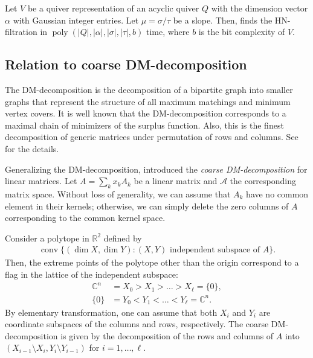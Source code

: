 \documentclass[a4paper,11pt]{article}
\numberwithin{equation}{section}
\newcommand{\C}{\mathbb{C}}
\newcommand{\R}{\mathbb{R}}
\newcommand{\caA}{\mathcal{A}}
\DeclareMathOperator{\poly}{poly}
\DeclareMathOperator{\conv}{conv}
\begin{document}
\begin{theorem}\label{thm:HN}
    Let $V$ be a quiver representation of an acyclic quiver $Q$ with the dimension vector $\alpha$ with Gaussian integer entries.
    Let $\mu = \sigma/\tau$ be a slope.
    Then,  finds the HN-filtration in $\poly(|Q|, |\alpha|, |\sigma|, |\tau|, b)$ time, where $b$ is the bit complexity of $V$.
\end{theorem}

\subsection{Relation to coarse DM-decomposition}\label{subsec:coarse-DM}
The DM-decomposition is the decomposition of a bipartite graph into smaller graphs that represent the structure of all maximum matchings and minimum vertex covers.
It is well known that the DM-decomposition corresponds to a maximal chain of minimizers of the surplus function.
Also, this is the finest decomposition of generic matrices under permutation of rows and columns.
See \cite{Murota2009} for the details.

Generalizing the DM-decomposition, \citet{Hirai2024} introduced the \emph{coarse DM-decomposition} for linear matrices.
Let $A = \sum_k x_k A_k$ be a linear matrix and $\caA$ the corresponding matrix space.
Without loss of generality, we can assume that $A_k$ have no common element in their kernels;
otherwise, we can simply delete the zero columns of $A$ corresponding to the common kernel space.

Consider a polytope in $\R^2$ defined by 
\begin{align}
    \conv\{(\dim X, \dim Y) : \text{$(X, Y)$ independent subspace of $A$} \}.
\end{align}
Then, the extreme points of the polytope other than the origin correspond to a flag in the lattice of the independent subspace:
\begin{align}
    \C^n  &= X_0 > X_1 > \dots > X_\ell = \{0\}, \\
    \{0\} &= Y_0 < Y_1 < \dots < Y_\ell = \C^n.
\end{align}
By elementary transformation, one can assume that both $X_i$ and $Y_i$ are coordinate subspaces of the columns and rows, respectively.
The coarse DM-decomposition is given by the decomposition of the rows and columns of $A$ into 
$
    (X_{i-1} \setminus X_i, Y_i \setminus Y_{i-1})
$
for $i = 1, \dots, \ell$.
 
\end{document}
